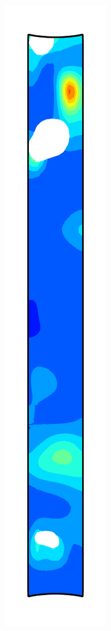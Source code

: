 \begin{figure}[!htb]
\begin{subfigure}{0.08\textwidth}
  \end{subfigure}
  \begin{subfigure}{0.08\textwidth}
    \centering
    \includegraphics[width=\textwidth]{Chapter5/figures/spallation/ep_2}

\end{subfigure}
\end{figure}
